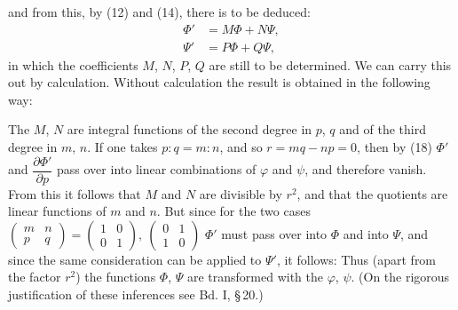 and from this, by (12) and (14), there is to be deduced:
\[
\begin{aligned}
\Phi' &= M\Phi + N\Psi,\\
\Psi' &= P\Phi + Q\Psi,
\end{aligned}
\]
in which the coefficients $M$, $N$, $P$, $Q$ are still to be determined.
We can carry this out by calculation. Without calculation the result
is obtained in the following way:

The $M$, $N$ are integral functions of the second degree in $p$, $q$ and
of the third degree in $m$, $n$. If one takes $p:q = m:n$, and so
$r = mq - np = 0$, then by (18) $\Phi'$ and $\dfrac{\partial \Phi'}{\partial p}$
pass over into linear combinations of $\varphi$ and $\psi$, and
therefore vanish. From this it follows that $M$ and $N$ are divisible
by $r^2$, and that the quotients are linear functions of $m$ and $n$. But
since for the two cases $\begin{pmatrix} m & n\\ p & q \end{pmatrix} = \begin{pmatrix} 1 & 0\\ 0 & 1 \end{pmatrix},\ \begin{pmatrix} 0 & 1\\ 1 & 0 \end{pmatrix}$
$\Phi'$ must pass over into $\Phi$ and into $\Psi$, and since the same
consideration can be applied to $\Psi'$, it follows:
Thus (apart from the factor $r^2$) the functions
$\Phi$, $\Psi$ are transformed  with the $\varphi$, $\psi$.
(On the rigorous justification of these inferences see Bd. I, §\,20.)

